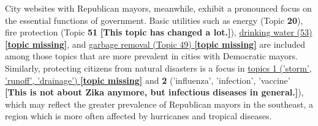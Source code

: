 \documentclass[11pt]{article}
\begin{document}
City websites with Republican mayors, meanwhile, exhibit a pronounced focus on the essential functions of government. Basic utilities such as energy (Topic \textbf{20}), fire protection (Topic \textbf{51} \textbf{[This topic has changed a lot.]}), \underline{drinking water (53) \textbf{[topic missing]}}, and \underline{garbage removal (Topic 49) \textbf{[topic missing]}} are included among those topics that are more prevalent in cities with Democratic mayors. Similarly, protecting citizens from natural disasters is a focus in \underline{topics 1 ('storm', 'runoff', 'drainage') \textbf{[topic missing]}} and \textbf{2} ('influenza', 'infection', 'vaccine' \textbf{[This is not about Zika anymore, but infectious diseases in general.]}), which may reflect the greater prevalence of Republican mayors in the southeast, a region which is more often affected by hurricanes and tropical diseases.




\end{document}
